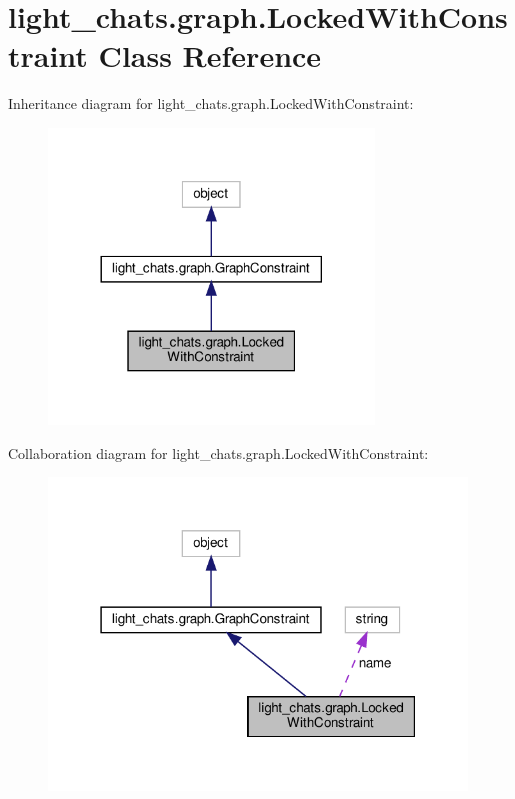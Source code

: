 \hypertarget{classlight__chats_1_1graph_1_1LockedWithConstraint}{}\section{light\+\_\+chats.\+graph.\+Locked\+With\+Constraint Class Reference}
\label{classlight__chats_1_1graph_1_1LockedWithConstraint}


Inheritance diagram for light\+\_\+chats.\+graph.\+Locked\+With\+Constraint\+:
\nopagebreak
\begin{figure}[H]
\begin{center}
\leavevmode
\includegraphics[width=245pt]{classlight__chats_1_1graph_1_1LockedWithConstraint__inherit__graph}
\end{center}
\end{figure}


Collaboration diagram for light\+\_\+chats.\+graph.\+Locked\+With\+Constraint\+:
\nopagebreak
\begin{figure}[H]
\begin{center}
\leavevmode
\includegraphics[width=315pt]{classlight__chats_1_1graph_1_1LockedWithConstraint__coll__graph}
\end{center}
\end{figure}
